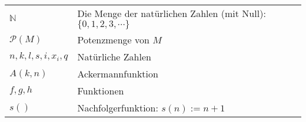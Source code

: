 \documentclass[a4paper]{amsart}
\theoremstyle{definition}
\newcommand{\N}{\ensuremath{\mathbb{ N }}}
\newcommand{\PP}{\ensuremath{\mathcal{ P }}}
\begin{document}
\renewcommand*{\arraystretch}{1}

\begin{tabular}{ll}
    $\N$                    & Die Menge der natürlichen Zahlen (mit Null): $\{ 0, 1, 2, 3, \cdots \}$\\
    $\PP(M)$                & Potenzmenge von $M$\\
    $n, k, l, s, i, x_i, q$ & Natürliche Zahlen\\
    $A( k, n )$             & Ackermannfunktion\\
    $f, g, h$               & Funktionen\\
    $s()$                   & Nachfolgerfunktion: $s(n) := n+1$

\end{tabular}
\end{document}

